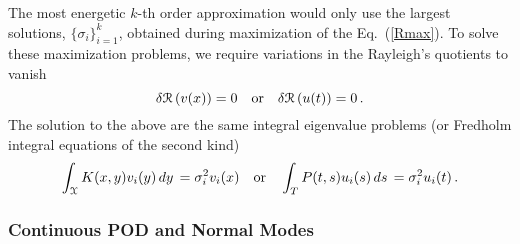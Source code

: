 \documentclass[10pt]{article}
\newcommand{\norm}[1]{\left\Vert#1\right\Vert}
\newcommand{\eq}[1]{Eq.\ (\ref{#1})}
\begin{document}
The most energetic $k$-th order approximation would only use the largest solutions, $\{\sigma_{i}\}_{i=1}^k$, obtained during maximization of the \eq{Rmax}.
To solve these maximization problems, we require variations in the Rayleigh's quotients to vanish
\begin{equation}
    \delta  {\cal R}\left(v(x)\right) = 0 \quad \mathrm{or} \quad \delta  {\cal R}\left(u(t)\right)=0\,.
\end{equation}
The solution to the above are the same integral eigenvalue problems (or Fredholm integral equations of the second kind)
\begin{equation}\label{Fred}
    \int_{\cal X} K(x,y)  v_i(y)  \, dy \, =\sigma_{i}^2  v_i(x)  \quad \mathrm{or} \quad 
    \int_T P(t,s)  u_i(s)  \, ds \, =\sigma_{i}^2  u_i(t)\,.
\end{equation}

\subsubsection{Continuous POD and Normal Modes}
\end{document}
